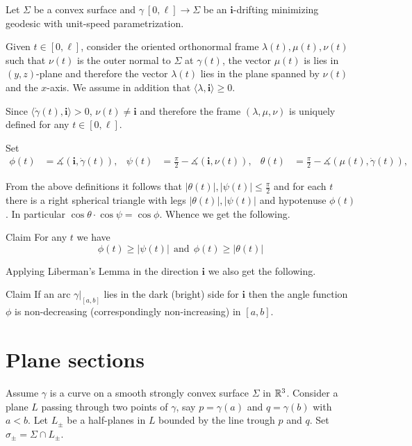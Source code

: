 \documentclass[a4paper,10pt]{amsart}
\begin{document}
Let $\Sigma$ be a convex surface 
and $\gamma\:[0,\ell]\to \Sigma$ be an $\bm{i}$-drifting minimizing geodesic 
with unit-speed para\-me\-tri\-za\-tion.

Given $t\in [0,\ell]$, 
consider the oriented orthonormal frame $\lambda(t),\mu(t),\nu(t)$ 
such that $\nu(t)$ is the outer normal to $\Sigma$ at $\gamma(t)$,
the vector $\mu(t)$ is lies in $(y,z)$-plane 
and therefore the vector $\lambda(t)$ lies in the plane spanned by $\nu(t)$ and the $x$-axis.
We assume in addition that $\langle\lambda,\bm{i}\rangle\ge 0$.

Since $\langle\dot\gamma(t),\bm{i}\rangle>0$, 
$\nu(t)\ne\bm{i}$
and therefore the frame $(\lambda,\mu,\nu)$ is uniquely defined for any $t\in[0,\ell]$.

Set 
\begin{align*}
\phi(t)&=\measuredangle(\bm{i},\dot\gamma(t)),&
\psi(t)&=\tfrac\pi2-\measuredangle(\bm{i},\nu(t)),&
\theta(t)&=\tfrac\pi2-\measuredangle(\mu(t),\dot\gamma(t)),
\end{align*}

From the above definitions it follows that $|\theta(t)|,|\psi(t)|\le \tfrac\pi2$ and for each $t$ there is a right spherical triangle with legs $|\theta(t)|,|\psi(t)|$ and hypotenuse $\phi(t)$.
In particular $\cos\theta\cdot\cos\psi=\cos\phi$.
Whence we get the following.

\begin{thm}{Claim}\label{clm:alpha-phi-psi}
For any $t$ we have 
\[
\phi(t)\ge |\psi(t)|\ \ \text{and}\ \ \phi(t)\ge |\theta(t)|
\]

\end{thm}

Applying Liberman's Lemma in the direction $\bm{i}$ we also get the following.

\begin{thm}{Claim}\label{clm:7.3}
If an arc $\gamma|_{[a,b]}$ lies in the dark (bright) side for $\bm{i}$ then 
the angle function $\phi$ is non-decreasing (correspondingly non-increasing)
in $[a,b]$.
\end{thm}

\section{Plane sections}

Assume $\gamma$ is a curve on a smooth strongly convex surface $\Sigma$ in $\mathbb{R}^3$.
Consider a plane $L$ 
passing through two points of $\gamma$, 
say $p=\gamma(a)$ and $q=\gamma(b)$ with $a<b$.
Let $L_\pm$ be a  half-planes in $L$ bounded by the line trough $p$ and $q$.
Set $\sigma_\pm=\Sigma\cap L_\pm$.
\end{document}
